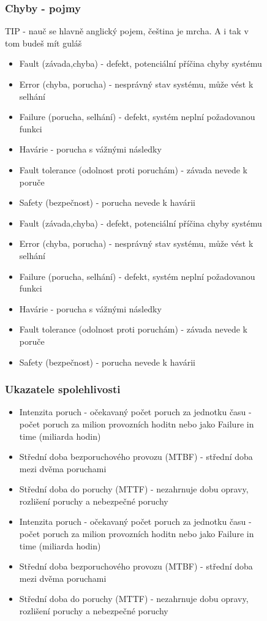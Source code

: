 \begin{figure}[h]
\subsubsection*{Chyby - pojmy}
TIP - nauč se hlavně anglický pojem, čeština je mrcha. A i tak v tom budeš mít guláš
\begin{itemize}
  \item Fault (závada,chyba) - defekt, potenciální příčina chyby systému
  \item Error (chyba, porucha) - nesprávný stav systému, může vést k selhání
  \item Failure (porucha, selhání) - defekt, systém neplní požadovanou funkci
  \item Havárie - porucha s vážnými následky
  \item Fault tolerance (odolnost proti poruchám) - závada nevede k poruče
  \item Safety (bezpečnost) - porucha nevede k havárii
    \item Fault (závada,chyba) - defekt, potenciální příčina chyby systému
    \item Error (chyba, porucha) - nesprávný stav systému, může vést k selhání
    \item Failure (porucha, selhání) - defekt, systém neplní požadovanou funkci
    \item Havárie - porucha s vážnými následky
    \item Fault tolerance (odolnost proti poruchám) - závada nevede k poruče
    \item Safety (bezpečnost) - porucha nevede k havárii
\end{itemize}

\subsubsection*{Ukazatele spolehlivosti}

\begin{itemize}
  \item Intenzita poruch - očekavaný počet poruch za jednotku času - počet poruch za milion provozních hoditn nebo jako Failure in time (miliarda hodin)
  \item Střední doba bezporuchového provozu (MTBF) - střední doba mezi dvěma poruchami
  \item Střední doba do poruchy (MTTF) - nezahrnuje dobu opravy, rozlišení poruchy a nebezpečné poruchy
    \item Intenzita poruch - očekavaný počet poruch za jednotku času - počet poruch za milion provozních hoditn nebo jako Failure in time (miliarda hodin)
    \item Střední doba bezporuchového provozu (MTBF) - střední doba mezi dvěma poruchami
    \item Střední doba do poruchy (MTTF) - nezahrnuje dobu opravy, rozlišení poruchy a nebezpečné poruchy
\end{itemize}


\end{figure}
